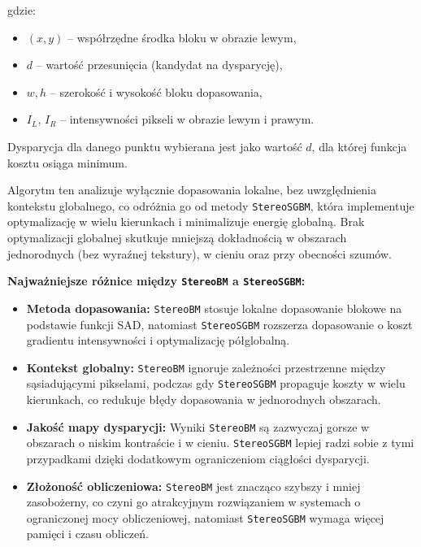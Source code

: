 \documentclass[magisterska]{pracadypl}
\begin{document}
gdzie:
\begin{itemize}
    \item $(x,y)$ -- współrzędne środka bloku w obrazie lewym,
    \item $d$ -- wartość przesunięcia (kandydat na dysparycję),
    \item $w,h$ -- szerokość i wysokość bloku dopasowania,
    \item $I_L$, $I_R$ -- intensywności pikseli w obrazie lewym i prawym.
\end{itemize}

Dysparycja dla danego punktu wybierana jest jako wartość $d$, dla której funkcja kosztu osiąga minimum.  

Algorytm ten analizuje wyłącznie dopasowania lokalne, bez uwzględnienia kontekstu globalnego, co odróżnia go od metody \texttt{StereoSGBM}, która implementuje optymalizację w wielu kierunkach i minimalizuje energię globalną. Brak optymalizacji globalnej skutkuje mniejszą dokładnością w obszarach jednorodnych (bez wyraźnej tekstury), w cieniu oraz przy obecności szumów.  

\textbf{Najważniejsze różnice między \texttt{StereoBM} a \texttt{StereoSGBM}:}
\begin{itemize}
    \item \textbf{Metoda dopasowania:}  
    \texttt{StereoBM} stosuje lokalne dopasowanie blokowe na podstawie funkcji SAD, natomiast \texttt{StereoSGBM} rozszerza dopasowanie o koszt gradientu intensywności i optymalizację półglobalną.
    
    \item \textbf{Kontekst globalny:}  
    \texttt{StereoBM} ignoruje zależności przestrzenne między sąsiadującymi pikselami, podczas gdy \texttt{StereoSGBM} propaguje koszty w wielu kierunkach, co redukuje błędy dopasowania w jednorodnych obszarach.
    
    \item \textbf{Jakość mapy dysparycji:}  
    Wyniki \texttt{StereoBM} są zazwyczaj gorsze w obszarach o niskim kontraście i w cieniu. \texttt{StereoSGBM} lepiej radzi sobie z tymi przypadkami dzięki dodatkowym ograniczeniom ciągłości dysparycji.
    
    \item \textbf{Złożoność obliczeniowa:}  
    \texttt{StereoBM} jest znacząco szybszy i mniej zasobożerny, co czyni go atrakcyjnym rozwiązaniem w systemach o ograniczonej mocy obliczeniowej, natomiast \texttt{StereoSGBM} wymaga więcej pamięci i czasu obliczeń.
\end{itemize}
\end{document}
